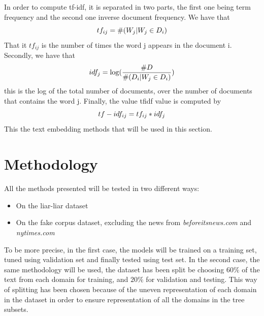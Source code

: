 In order to compute tf-idf, it is separated in two parts, the first one being term frequency and the second one inverse document frequency. We have that \begin{equation}
 tf_{ij} = \#(W_j | W_j \in D_i)\\ 
\end{equation}
That it $tf_{ij}$ is the number of times the word j appears in the document i. 
Secondly, we have that \begin{equation*}
 idf_{j} = \log(\frac{\#D}{\#(D_i | W_j \in D_i)}) \\
\end{equation*}
this is the log of the total number of documents, over the number of documents that contains the word j.
Finally, the value tfidf value is computed by \begin{equation}
 tf-idf_{ij} = tf_{ij} * idf_{j} \\
\end{equation}
This the text embedding methods that will be used in this section. 
\section{Methodology}
\paragraph{} All the methods presented will be tested in two different ways: 
\begin{itemize}
 \item On the liar-liar dataset
 \item On the fake corpus dataset, excluding the news from \textit{beforeitsnews.com} and \textit{nytimes.com}
\end{itemize}
To be more precise, in the first case, the models will be trained on a training set, tuned using validation set and finally tested using test set. In the second case, the same methodology will be used, the dataset has been split be choosing $60\%$ of the text from each domain for training, and $20\%$ for validation and testing. This way of splitting has been chosen because of the uneven representation of each domain in the dataset in order to ensure representation of all the domains in the tree subsets. 
